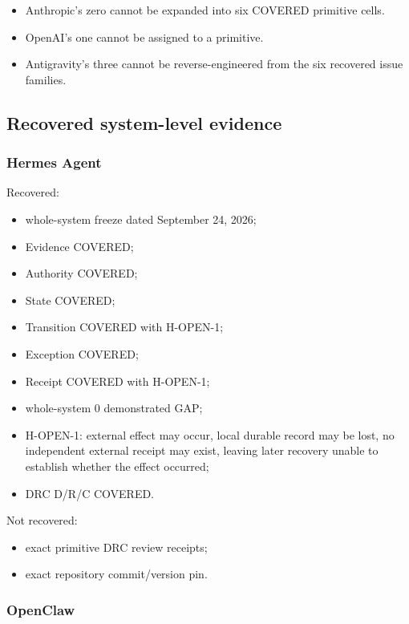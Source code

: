 \documentclass[11pt]{article}
\begin{document}
\begin{itemize}
\item Anthropic's zero cannot be expanded into six COVERED primitive cells.
\item OpenAI's one cannot be assigned to a primitive.
\item Antigravity's three cannot be reverse-engineered from the six recovered issue families.
\end{itemize}

\subsection{Recovered system-level evidence}

\subsubsection{Hermes Agent}

Recovered:

\begin{itemize}
\item whole-system freeze dated September 24, 2026;
\item Evidence COVERED;
\item Authority COVERED;
\item State COVERED;
\item Transition COVERED with H-OPEN-1;
\item Exception COVERED;
\item Receipt COVERED with H-OPEN-1;
\item whole-system 0 demonstrated GAP;
\item H-OPEN-1: external effect may occur, local durable record may be lost, no independent external receipt may exist, leaving later recovery unable to establish whether the effect occurred;
\item DRC D/R/C COVERED.
\end{itemize}

Not recovered:

\begin{itemize}
\item exact primitive DRC review receipts;
\item exact repository commit/version pin.
\end{itemize}

\subsubsection{OpenClaw}
\end{document}
